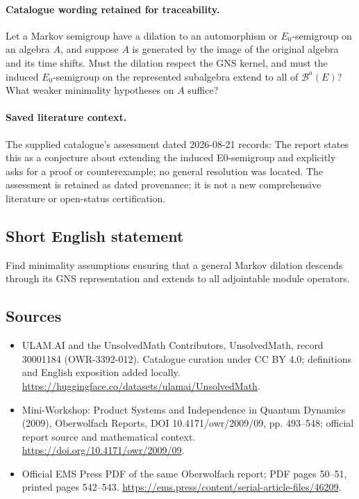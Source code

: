 \documentclass[11pt]{article}
\begin{document}
\paragraph{Catalogue wording retained for traceability.}
Let a Markov semigroup have a dilation to an automorphism or $E_0$-semigroup on an algebra $A$, and suppose $A$ is generated by the image of the original algebra and its time shifts. Must the dilation respect the GNS kernel, and must the induced $E_0$-semigroup on the represented subalgebra extend to all of $\mathcal B^a(E)$? What weaker minimality hypotheses on $A$ suffice?

\paragraph{Saved literature context.} The supplied catalogue's assessment dated 2026-08-21 records: The report states this as a conjecture about extending the induced E0-semigroup and explicitly asks for a proof or counterexample; no general resolution was located. The assessment is retained as dated provenance; it is not a new comprehensive literature or open-status certification.
\subsection{Short English statement}
Find minimality assumptions ensuring that a general Markov dilation descends through its GNS representation and extends to all adjointable module operators.
\subsection{Sources}
\begin{itemize}
\item[\hypertarget{source:30001184:1}{S1}] ULAM.AI and the UnsolvedMath Contributors, UnsolvedMath, record 30001184 (OWR-3392-012). Catalogue curation under CC BY 4.0; definitions and English exposition added locally.
\url{https://huggingface.co/datasets/ulamai/UnsolvedMath}.
\item[\hypertarget{source:30001184:2}{S2}] Mini-Workshop: Product Systems and Independence in Quantum Dynamics (2009), Oberwolfach Reports, DOI 10.4171/owr/2009/09, pp. 493--548; official report source and mathematical context.
\url{https://doi.org/10.4171/owr/2009/09}.
\item[\hypertarget{source:30001184:3}{S3}] Official EMS Press PDF of the same Oberwolfach report; PDF pages 50--51, printed pages 542--543.
\url{https://ems.press/content/serial-article-files/46209}.
\end{itemize}
\label{end:30001184}
\end{document}
